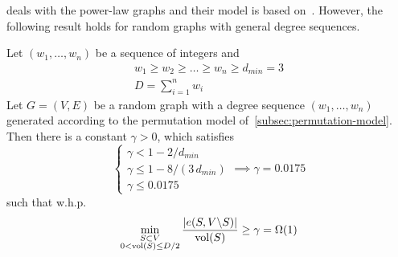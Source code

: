 \cite{gms03} deals with the power-law graphs and their model is based on~\cite{acl01}.
However, the following result holds for random graphs with general degree sequences.

\begin{theorem}
    \label{thm:gms}
    Let $(w_1,\ldots,w_n)$ be a sequence of integers and
    \begin{gather}
        w_1\geq w_2\geq \ldots\geq w_n\geq d_{min}=3\\
        D=\sum_{i=1}^{n}{w_i} %
    \end{gather}
    Let $G=(V,E)$ be a random graph with a degree sequence $(w_1,\ldots,w_n)$
    generated according to the permutation model of~\autoref{subsec:permutation-model}.
    Then there is a constant $\gamma>0$, which satisfies
    \begin{equation}
        \begin{cases}
            \gamma<1-2/d_{min}\\
            \gamma\leq1-8/(3\,d_{min})\\
            \gamma\leq 0.0175
        \end{cases}\implies
        \gamma=0.0175
    \end{equation}
    such that w.h.p.
    \begin{equation}
        \min_{\substack{S\subset V\\0<\operatorname*{vol}(S)\leq D/2}}
        \frac{|e(S,V\backslash S)|}{\operatorname*{vol}(S)}\geq\gamma=\Omega(1)
    \end{equation}
\end{theorem}

